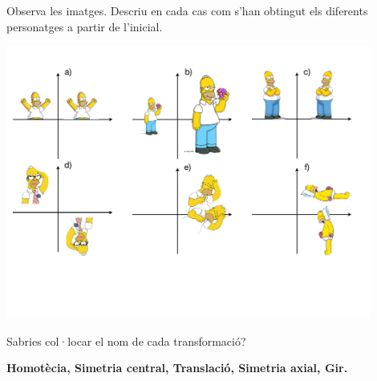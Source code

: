  

\begin{iniaval}
	
	Observa les imatges. Descriu en cada cas com s'han obtingut els diferents personatges a partir de l'inicial.
	
	\begin{center}
		\includegraphics[width=0.9\textwidth]{img-10/iniaval}
	\end{center}

	Sabries col·locar el nom de cada transformació? 
	
	\begin{center}
		 \textbf{ Homotècia, Simetria central, Translació, Simetria axial, Gir. }
	\end{center}
\end{iniaval}

